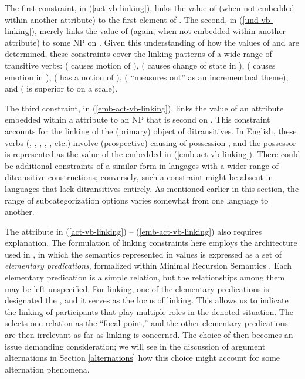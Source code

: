 \documentclass[output=paper]{langsci/langscibook}
\begin{document}
\noindent
The first constraint, in (\ref{act-vb-linking}), links the value of  (when not embedded within another attribute) to the first element of \argst.
The second, in (\ref{und-vb-linking}), merely links the value of  (again, when not embedded within another attribute) to some NP on \argst.
Given this understanding of how the values of  and  are determined, these constraints cover the linking patterns of a wide range of transitive verbs:  ( causes motion of ),  ( causes change of state in ),  ( causes emotion in ),  ( has a notion of ),  ( ``measures out''  as an incrememtnal theme), and  ( is superior to  on a scale).

The third constraint, in (\ref{emb-act-vb-linking}), links the value of an  attribute embedded within a  attribute to an NP that is second on \argst.
This constraint accounts for the linking of the (primary) object of ditransitives.
In English, these verbs (, , , , , etc.) involve (prospective) causing of possession \citep{Pinker1989,Goldberg1995}, and the possessor is represented as the value of the embedded  in (\ref{emb-act-vb-linking}).
There could be additional constraints of a similar form in langages with a wider range of ditransitive constructions; conversely, such a constraint might be absent in languages that lack ditransitives entirely.
As mentioned earlier in this section, the range of subcategorization options varies somewhat from one language to another.

The  attribute in (\ref{act-vb-linking}) -- (\ref{emb-act-vb-linking}) also requires explanation.
The formulation of linking constraints here employs the architecture used in \citet{KoenigandDavis2006}, in which the semantics represented in \content values is expressed as a set of \emph{elementary predications}, formalized within Minimal Recursion Semantics \citep{Copestakeetal2001,Copestakeetal2005}.
Each elementary predication is a simple relation, but the relationships among them may be left unspecified.
For linking, one of the elementary predications is designated the , and it serves as the locus of linking.
This allows us to %
indicate the linking of participants that play multiple roles in the denoted situation. 
The  selects one relation as the ``focal point,'' and the other elementary predications are then irrelevant as far as linking is concerned. 
The choice of  then becomes an issue demanding consideration; we will see in the discussion of argument alternations in Section \ref{alternations} how this choice might account for some alternation phenomena.
\end{document}
